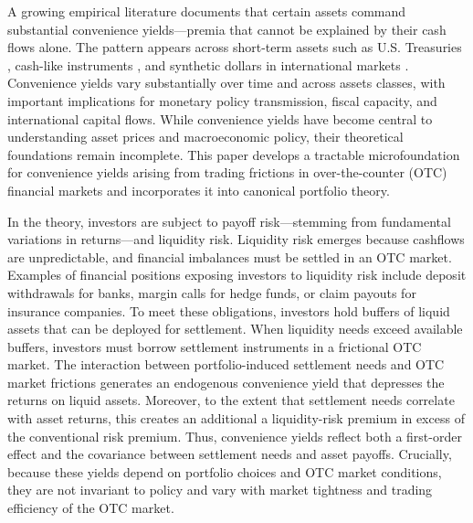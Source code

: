 
A growing empirical literature documents that certain assets command
substantial convenience yields---premia that cannot be explained
by their cash flows alone. The pattern appears across short-term assets
such as U.S. Treasuries \citep{Krishnamurthy2012}, cash-like instruments
\citep{Nagel2016}, and synthetic dollars in international markets
\citep{JiangKrishnamurthyLustig2021,EngelWu2023}. Convenience yields
vary substantially over time and across assets classes, with important
implications for monetary policy transmission, fiscal capacity, and
international capital flows. While convenience yields have become
central to understanding asset prices and macroeconomic policy, their
theoretical foundations remain incomplete. This paper develops a tractable microfoundation for convenience yields arising from trading frictions in over-the-counter (OTC) financial markets and incorporates it into canonical portfolio theory.


In the theory, investors are subject to payoff risk---stemming from fundamental variations in returns---and liquidity risk.
Liquidity risk emerges because cashflows are unpredictable, and financial imbalances must be settled in an OTC market. Examples of financial
positions exposing investors to liquidity risk
include deposit withdrawals for banks, margin calls for hedge funds,
or claim payouts for insurance companies. To meet these obligations,
investors hold buffers of liquid assets that can be deployed for settlement.
When liquidity needs exceed available buffers, investors must borrow
settlement instruments in a frictional OTC market. 
The interaction
between portfolio-induced settlement needs and OTC market frictions
generates an endogenous convenience yield that depresses the returns
on liquid assets. Moreover, to the extent that settlement needs   correlate with
asset returns, this creates an additional a liquidity-risk
premium in excess of the conventional risk premium. Thus, convenience yields
reflect both  a first-order effect  and the covariance between
settlement needs and asset payoffs. Crucially, because these yields
depend on portfolio choices and OTC market conditions, they are not
invariant to policy and vary with market tightness and trading efficiency
of the OTC market.


